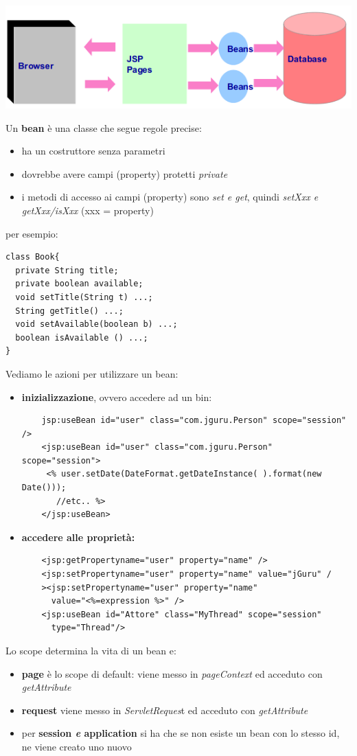 \message{ !name(sd.tex)}\documentclass[a4paper,12pt, oneside]{book}
\begin{document}
\begin{center}
	\includegraphics[scale=0.7]{img/mvc.png}
\end{center}
Un \textbf{bean} è una classe che segue regole precise:
\begin{itemize}
	\item ha un costruttore senza parametri
	\item dovrebbe avere campi (property) protetti \textit{private}
	\item i metodi di accesso ai campi (property) sono \textit{set e get}, quindi \textit{setXxx e getXxx/isXxx} (xxx = property) 
\end{itemize}
per esempio:
\begin{verbatim}
class Book{
  private String title;
  private boolean available;
  void setTitle(String t) ...;
  String getTitle() ...;
  void setAvailable(boolean b) ...;
  boolean isAvailable () ...;
}
\end{verbatim}
Vediamo le azioni per utilizzare un bean:
\begin{itemize}
    \item \textbf{inizializzazione}, ovvero accedere ad un bin:
    \begin{verbatim}
    jsp:useBean id="user" class="com.jguru.Person" scope="session" />
    <jsp:useBean id="user" class="com.jguru.Person" scope="session">
     <% user.setDate(DateFormat.getDateInstance( ).format(new Date())); 
       //etc.. %> 
    </jsp:useBean> 
    \end{verbatim}
    \item \textbf{accedere alle proprietà:}
    \begin{verbatim}
    <jsp:getPropertyname="user" property="name" />
    <jsp:setPropertyname="user" property="name" value="jGuru" /
    ><jsp:setPropertyname="user" property="name" 
      value="<%=expression %>" />
    <jsp:useBean id="Attore" class="MyThread" scope="session"
      type="Thread"/>
    \end{verbatim}
\end{itemize}
Lo scope determina la vita di un bean e:
\begin{itemize}
    \item \textbf{page} è lo scope di default: viene messo in \textit{pageContext} ed acceduto con \textit{getAttribute}
    \item \textbf{request} viene messo in \textit{ServletReques}t ed acceduto con \textit{getAttribute}
    \item per \textbf{session \textit{e} application} si ha che se non esiste un bean con lo stesso id, ne viene creato uno nuovo
\end{itemize}
\end{document}

